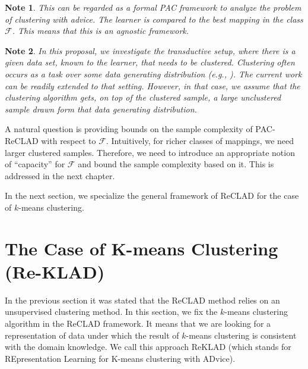 \documentclass[letterpaper,12pt,titlepage,oneside,final]{book}
\newtheorem{note}{Note}
\begin{document}
\begin{note}
This can be regarded as a formal PAC framework to analyze the problem of clustering with advice. The learner is compared to the best mapping in the class $\mathcal{F}$. This means that this is an \emph{agnostic} framework.
\end{note}

\begin{note}
In this proposal, we investigate the \emph{transductive} setup, where there is a given data set, known to the learner, that needs to be clustered. Clustering often occurs as a task over some data generating distribution (e.g., \cite{von2005towards}). The current work can be readily extended to that setting. However, in that case, we assume that the clustering algorithm gets, on top of the clustered sample, a large unclustered sample drawn form that data generating distribution.

\end{note}

A natural question is providing bounds on the sample complexity of PAC-ReCLAD with respect to $\mathcal{F}$. Intuitively, for richer classes of mappings, we need larger clustered samples. Therefore, we need to introduce an appropriate notion of ``capacity'' for $\mathcal{F}$ and bound the sample complexity based on it. This is addressed in the next chapter. 

In the next section, we specialize the general framework of ReCLAD for the case of $k$-means clustering.




\section{The Case of K-means Clustering (Re-KLAD)}


In the previous section it was stated that the ReCLAD method relies on an unsupervised clustering method. In this section, we fix the $k$-means clustering algorithm in the ReCLAD framework. It means that we are looking for a representation of data under which the result of $k$-means clustering is consistent with the domain knowledge. We call this approach ReKLAD (which stands for REpresentation Learning for K-means clustering with ADvice).
\end{document}

